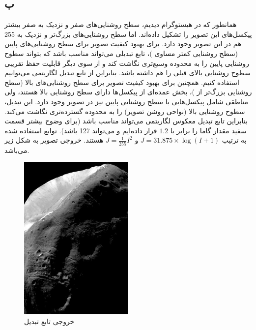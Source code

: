 \documentclass{article}
\begin{document}
\subsection{ب}
همانطور که در هیستوگرام دیدیم، سطح روشنایی‌های صفر و نزدیک به صفر بیشتر پیکسل‌های این تصویر را تشکیل داده‌اند. اما سطح روشنایی‌های بزرگ‌تر و نزدیک به 255 هم در این تصویر وجود دارد. برای بهبود کیفیت تصویر برای سطح روشنایی‌های پایین (سطح روشنایی کمتر مساوی  )، تابع تبدیلی می‌تواند مناسب باشد که بتواند سطوح روشنایی پایین را به محدوده وسیع‌تری نگاشت کند و از سوی دیگر قابلیت حفظ تقریبی سطوح روشنایی بالای قبلی را هم داشته باشد. بنابراین از تابع تبدیل لگاریتمی می‌توانیم استفاده کنیم. همچنین برای بهبود کیفیت تصویر برای سطح روشنایی‌های بالا (سطح روشنایی بزرگ‌تر از )، بخش عمده‌ای از پیکسل‌ها دارای سطح روشنایی بالا هستند، ولی مناطقی شامل پیکسل‌هایی با سطح روشنایی پایین نیز در تصویر وجود دارد. این تبدیل، سطوح روشنایی بالا (نواحی روشن تصویر) را به محدوده گسترده‌تری نگاشت می‌کند. بنابراین تابع تبدیل معکوس لگاریتمی می‌تواند مناسب باشد (برای وضوح بیشتر قسمت سفید مقدار گاما را برابر با $1.2$ قرار داده‌ایم و   می‌تواند 127 باشد). توابع استفاده شده به ترتیب $J = 31.875\times \log (I+1)$ و $J = \frac{1}{255}I^{2}$ هستند. خروجی تصویر به شکل زیر می‌باشد.
\begin{figure}[H]
    \centering
    \includegraphics[width=0.5\textwidth]{figures/6b.jpg}
    \caption
	{
خروجی تابع تبدیل
	}
    \label{fig:fig1}
\end{figure}

\subsection{}
\begin{latin}

\end{latin}
\end{document}
